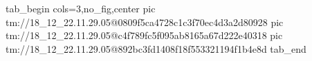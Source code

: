  
 
 
 
 

\qqSecCmtScr


\ifcmt
  tab_begin cols=3,no_fig,center
    pic tm://18_12_22.11.29.05@0809f5ca4728c1c3f70ec4d3a2d80928
    pic tm://18_12_22.11.29.05@c4f789fc5f095ab8165a67d222e40318
    pic tm://18_12_22.11.29.05@892bc3fd1408f18f553321194f1b4e8d
  tab_end
\fi

